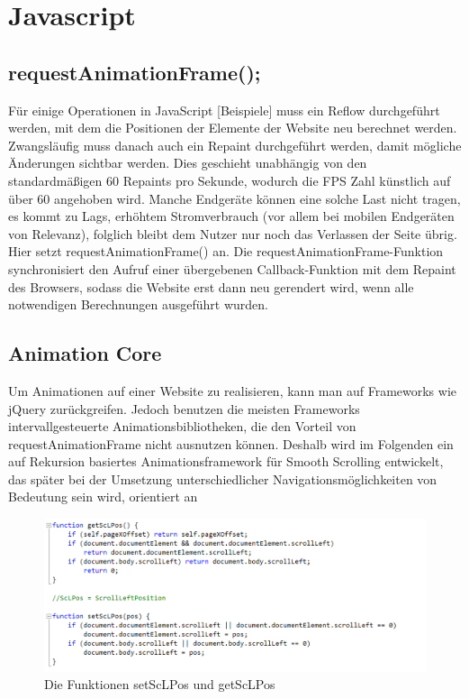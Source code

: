 \section{Javascript}

	\subsection{requestAnimationFrame();}
Für einige Operationen in JavaScript [Beispiele] muss ein Reflow durchgeführt werden, mit dem die Positionen der Elemente der Website neu berechnet werden. Zwangsläufig muss danach auch ein Repaint durchgeführt werden, damit mögliche Änderungen sichtbar werden. Dies geschieht unabhängig von den standardmäßigen 60 Repaints pro Sekunde, wodurch die FPS Zahl künstlich auf über 60 angehoben wird. Manche Endgeräte können eine solche Last nicht tragen, es kommt zu Lags, erhöhtem Stromverbrauch (vor allem bei mobilen Endgeräten von Relevanz), folglich bleibt dem Nutzer nur noch das Verlassen der Seite übrig. Hier setzt requestAnimationFrame() an.
Die requestAnimationFrame-Funktion synchronisiert den Aufruf einer übergebenen Callback-Funktion mit dem Repaint des Browsers, sodass die Website erst dann neu gerendert wird, wenn alle notwendigen Berechnungen ausgeführt wurden.


\subsection{Animation Core}
Um Animationen auf einer Website zu realisieren, kann man auf Frameworks wie jQuery zurückgreifen. Jedoch benutzen die meisten Frameworks intervallgesteuerte Animationsbibliotheken, die den Vorteil von requestAnimationFrame nicht ausnutzen können. Deshalb wird im Folgenden ein auf Rekursion basiertes Animationsframework für Smooth Scrolling entwickelt, das später bei der Umsetzung unterschiedlicher Navigationsmöglichkeiten von Bedeutung sein wird, orientiert an 

\begin{figure} [h]
\includegraphics[width=\textwidth]{./img/js_get_set.png}
\caption{Die Funktionen setScLPos und getScLPos}
\label{js_get_set}
\end{figure}

